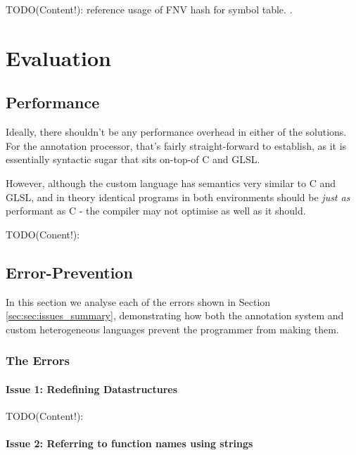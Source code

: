 \documentclass[a4paper,12pt,twoside,openright]{report}
\begin{document}
TODO(Content!): reference usage of FNV hash for symbol table. \cite{FNVHash}.


\chapter{Evaluation}



\section{Performance}

Ideally, there shouldn't be any performance overhead in either of the
solutions. For the annotation processor, that's fairly straight-forward to
establish, as it is essentially syntactic sugar that sits on-top-of C and GLSL.

However, although the custom language has semantics very similar to C and GLSL,
and in theory identical programs in both environments should be \textit{just
as} performant as C - the compiler may not optimise as well as it should.

TODO(Conent!):

\section{Error-Prevention}

In this section we analyse each of the errors shown in Section
\ref{sec:sec:issues_summary}, demonstrating how both the annotation system and
custom heterogeneous languages prevent the programmer from making them.

\subsection{The Errors}

\subsubsection{Issue 1: Redefining Datastructures}

TODO(Content!):

\subsubsection{Issue 2: Referring to function names using strings}
\end{document}
